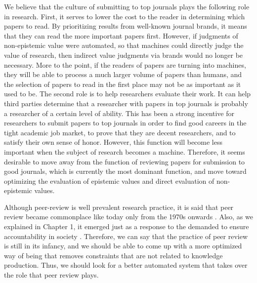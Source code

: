 We believe that the culture of submitting to top journals plays the following role in research. First, it serves to lower the cost to the reader in determining which papers to read. By prioritizing results from well-known journal brands, it means that they can read the more important papers first. However, if judgments of non-epistemic value were automated, so that machines could directly judge the value of research, then indirect value judgments via brands would no longer be necessary. More to the point, if the readers of papers are turning into machines, they will be able to process a much larger volume of papers than humans, and the selection of papers to read in the first place may not be as important as it used to be. The second role is to help researchers evaluate their work. It can help third parties determine that a researcher with papers in top journals is probably a researcher of a certain level of ability. This has been a strong incentive for researchers to submit papers to top journals in order to find good careers in the tight academic job market, to prove that they are decent researchers, and to satisfy their own sense of honor. However, this function will become less important when the subject of research becomes a machine. Therefore, it seems desirable to move away from the function of reviewing papers for submission to good journals, which is currently the most dominant function, and move toward optimizing the evaluation of epistemic values and direct evaluation of non-epistemic values.

Although peer-review is well prevalent research practice, it is said that peer review became commonplace like today only from the 1970s onwards \cite{baldwin2018scientific}. Also, as we explained in Chapter 1, it emerged just as a response to the demanded to ensure accountability in society \cite{baldwin2018scientific}. Therefore, we can say that the practice of peer review is still in its infancy, and we should be able to come up with a more optimized way of being that removes constraints that are not related to knowledge production. Thus, we should look for a better automated system that takes over the role that peer review plays.



